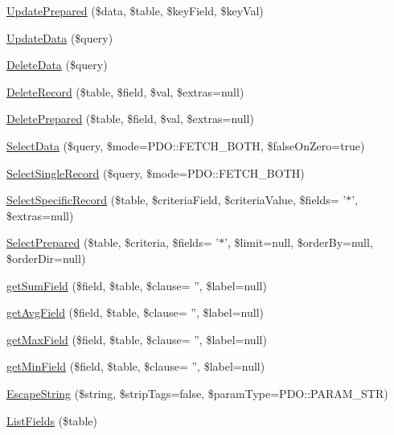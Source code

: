 \begin{DoxyCompactItemize}
\item 
\hyperlink{classdb_p_d_o_a39d5d8136607cadcb4ce7435c05e0ae6}{Update\-Prepared} (\$data, \$table, \$key\-Field, \$key\-Val)
\item 
\hyperlink{classdb_p_d_o_a9d8e6bafc3a9a916619905149e942899}{Update\-Data} (\$query)
\item 
\hyperlink{classdb_p_d_o_a000b483a85c314aec4a33cba9fe270fc}{Delete\-Data} (\$query)
\item 
\hyperlink{classdb_p_d_o_a978067e18db2c66e6fc145666dc47704}{Delete\-Record} (\$table, \$field, \$val, \$extras=null)
\item 
\hyperlink{classdb_p_d_o_aff0a48ec6c7c9cd47d0b18641b75fad2}{Delete\-Prepared} (\$table, \$field, \$val, \$extras=null)
\item 
\hyperlink{classdb_p_d_o_a8dcdb949658f7e241d5668e82687bd39}{Select\-Data} (\$query, \$mode=P\-D\-O\-::\-F\-E\-T\-C\-H\-\_\-\-B\-O\-T\-H, \$false\-On\-Zero=true)
\item 
\hyperlink{classdb_p_d_o_a13df306ce8e6e3b54c598172d854a6e9}{Select\-Single\-Record} (\$query, \$mode=P\-D\-O\-::\-F\-E\-T\-C\-H\-\_\-\-B\-O\-T\-H)
\item 
\hyperlink{classdb_p_d_o_a0dd22b74a556f9f43ae53548cb7699ac}{Select\-Specific\-Record} (\$table, \$criteria\-Field, \$criteria\-Value, \$fields= '$\ast$', \$extras=null)
\item 
\hyperlink{classdb_p_d_o_a1634a82616e367dd602cebf65add9e09}{Select\-Prepared} (\$table, \$criteria, \$fields= '$\ast$', \$limit=null, \$order\-By=null, \$order\-Dir=null)
\item 
\hyperlink{classdb_p_d_o_a4d584dd1e4be28f2a7379052bb37ab88}{get\-Sum\-Field} (\$field, \$table, \$clause= '', \$label=null)
\item 
\hyperlink{classdb_p_d_o_a8b568e0243996807cf756d1ed3d6803a}{get\-Avg\-Field} (\$field, \$table, \$clause= '', \$label=null)
\item 
\hyperlink{classdb_p_d_o_aa3d3c4386260cf9ef621e8bebff62160}{get\-Max\-Field} (\$field, \$table, \$clause= '', \$label=null)
\item 
\hyperlink{classdb_p_d_o_ae2d5882188b4ac6bd24118262f5062c2}{get\-Min\-Field} (\$field, \$table, \$clause= '', \$label=null)
\item 
\hyperlink{classdb_p_d_o_a57fb58572b8b73754677fcc9206526e2}{Escape\-String} (\$string, \$strip\-Tags=false, \$param\-Type=P\-D\-O\-::\-P\-A\-R\-A\-M\-\_\-\-S\-T\-R)
\item 
\hyperlink{classdb_p_d_o_ae71f1ba634ecb883630cc61bb28966b4}{List\-Fields} (\$table)

\end{DoxyCompactItemize}
